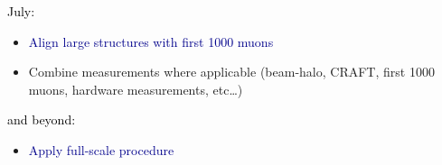 \documentclass[compress]{beamer}
\begin{document}
\begin{frame}
\vspace{-0.25 cm}
\textcolor{black}{July:}
\begin{itemize}
\item \scriptsize \textcolor{darkblue}{Align large structures with first 1000 muons}
\item \scriptsize Combine measurements where applicable (beam-halo,
CRAFT, first 1000 muons, hardware measurements, etc\ldots)
\end{itemize}

\textcolor{black}{and beyond:}
\begin{itemize}
\item \scriptsize \textcolor{darkblue}{Apply full-scale procedure}
\end{itemize}
\end{frame}

\end{document}
